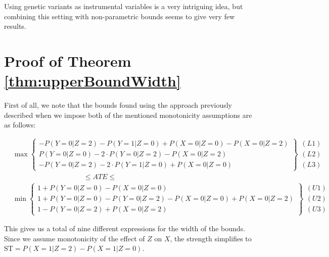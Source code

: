 \documentclass[
]{article}
\theoremstyle{plain}
\begin{document}
Using genetic variants as instrumental variables is a very intriguing idea, but combining this setting with non-parametric bounds seems to give very few results.

\newpage

\hypertarget{appendix-appendix}{%
\appendix}


\hypertarget{proof-of-theorem}{%
\section{\texorpdfstring{Proof of Theorem \ref{thm:upperBoundWidth}}{Proof of Theorem }}\label{proof-of-theorem}}

First of all, we note that the bounds found using the approach previously described when we impose both of the mentioned monotonicity assumptions are as follows:

\[
  \begin{aligned}
    &\max
      \begin{Bmatrix}
        -P(Y = 0 | Z = 2) - P(Y = 1 | Z = 0) + P(X = 0 | Z = 0) - P(X = 0 | Z = 2) \\
        P(Y = 0 | Z = 0) - 2\cdot P(Y = 0 | Z = 2) - P(X = 0 | Z = 2) \\
        -P(Y = 0 | Z = 2) - 2\cdot P(Y = 1 | Z = 0) + P(X = 0 | Z = 0)
      \end{Bmatrix} 
      \begin{matrix} (L1) \\ (L2) \\ (L3) \end{matrix}  \\
    &\qquad \qquad \qquad \qquad \qquad\le ATE \le \\
    &\min
      \begin{Bmatrix}
        1 + P(Y = 0 | Z = 0) - P(X = 0 | Z = 0) \\
        1 + P(Y = 0 | Z = 0) - P(Y = 0 | Z = 2) - P(X = 0 | Z = 0) + P(X = 0 | Z = 2) \\
        1 - P(Y = 0 | Z = 2) +  P(X = 0 | Z = 2)
      \end{Bmatrix}
      \begin{matrix} (U1) \\ (U2) \\ (U3) \end{matrix}
  \end{aligned}
\]

This gives us a total of nine different expressions for the width of the bounds. Since we assume monotonicity of the effect of \(Z\) on \(X\), the strength simplifies to \(\text{ST} = P(X = 1 | Z = 2) - P(X = 1 | Z = 0)\).
\end{document}
